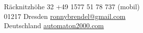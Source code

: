 \color{header-blue}

	\section*{\Huge \name}

	R\"acknitzh\"ohe 32 \hfill +49 1577 51 78 737 (mobil)\\
	01217 Dresden \hfill \href{mailto:ronnybrendel@gmail.com}{ronnybrendel@gmail.com}\\
	Deutschland \hfill \href{http://automaton2000.com}{automaton2000.com}

\color{black}

\vspace{0.6cm}
